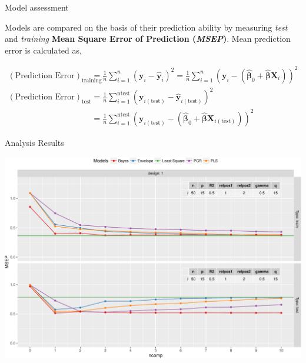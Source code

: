 \documentclass[ignorenonframetext,]{beamer}
\begin{document}
\begin{frame}{Model assessment}

Models are compared on the basis of their prediction ability by
measuring \emph{test} and \emph{training} \textbf{Mean Square Error of
Prediction (\emph{MSEP})}. Mean prediction error is calculated as,

\[
\begin{aligned}
\left(\text{Prediction Error}\right)_\text{training} &= \frac{1}{n}\sum_{i = 1}^n\left({\boldsymbol{y}_i - \hat{\boldsymbol{y}}_i}\right)^2 = \frac{1}{n}\sum_{i = 1}^n\left({\boldsymbol{y}_i - \left(\hat{\boldsymbol{\beta}}_0 + \hat{\boldsymbol{\beta}}\boldsymbol{X}_i\right)}\right)^2 \\
\left(\text{Prediction Error}\right)_\text{test} &= \frac{1}{n}\sum_{i = 1}^\text{ntest}\left({\boldsymbol{y}_{i\left(\text{test}\right)} - \hat{\boldsymbol{y}}_{i\left(\text{test}\right)}}\right)^2 \\ &= \frac{1}{n}\sum_{i = 1}^\text{ntest}\left({\boldsymbol{y}_{i\left(\text{test}\right)} - \left(\hat{\boldsymbol{\beta}}_0 + \hat{\boldsymbol{\beta}}\boldsymbol{X}_{i\left(\text{test}\right)}\right)}\right)^2
\end{aligned}
\]

\end{frame}

\begin{frame}{Analysis Results}

\includegraphics{Main_files/figure-beamer/unnamed-chunk-6-1.pdf}

\end{frame}
\end{document}
